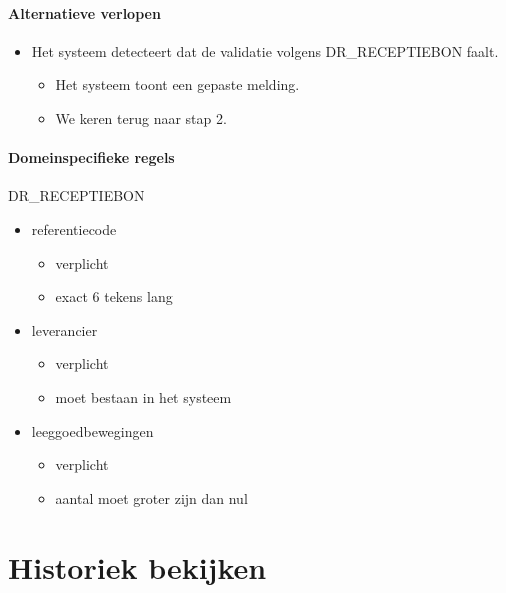    \paragraph{Alternatieve verlopen}
    \begin{itemize}[nosep]
        \item[5A.] Het systeem detecteert dat de validatie volgens DR\_RECEPTIEBON faalt.
        \begin{itemize}
            \item[5A1.] Het systeem toont een gepaste melding.
            \item[5A2.] We keren terug naar stap 2.
        \end{itemize}
    \end{itemize}

    \paragraph{Domeinspecifieke regels}
    DR\_RECEPTIEBON
    \begin{itemize}
        \item referentiecode
        \begin{itemize}
            \item verplicht
            \item exact 6 tekens lang
        \end{itemize}
        \item leverancier
        \begin{itemize}
            \item verplicht
            \item moet bestaan in het systeem
        \end{itemize}
        \item leeggoedbewegingen
        \begin{itemize}
            \item verplicht
            \item aantal moet groter zijn dan nul
        \end{itemize}
    \end{itemize}

    \vspace{1cm}
\pagebreak
\section{Historiek bekijken}
\label{uc:historiek-bekijken}

    \vspace{0.5em}

